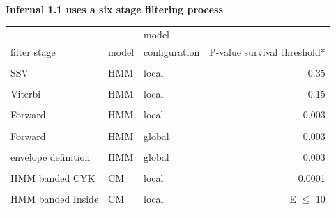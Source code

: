 \documentclass[landscape]{slides}
\begin{document}
\begin{slide}
\begin{center}
\textbf{Infernal 1.1 uses a six stage filtering process}
\end{center}

\scriptsize
\begin{center}
\begin{tabular}{lll|r|}
              &       & model         & \\
filter stage  & model & configuration & P-value survival threshold* \\ \hline
& & & \\
SSV                 & HMM & local  & 0.35 \\
& & & \\
Viterbi             & HMM & local  & 0.15 \\
& & & \\
Forward             & HMM & local  & 0.003 \\
& & & \\
Forward             & HMM & global & 0.003 \\
& & & \\
envelope definition & HMM & global & 0.003 \\
& & & \\
HMM banded CYK      & CM  & local  & 0.0001 \\
& & & \\
HMM banded Inside   & CM  & local  & E $\leq$ 10 \\ \hline
& & & \\
\end{tabular}
\end{center}

\vfill
\end{slide}
\end{document}
